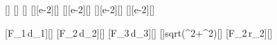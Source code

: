 [\newton]
[\newton]
[\newton]
[\cm][e-2][\meter]
[\cm][e-2][\meter]
[\cm][e-2][\meter]
[\cm][e-2][\meter]

[F_1\,d_1]{\FaX*\daX}[\newton\meter]
[F_2\,d_2]{\FbX*\dbX}[\newton\meter]
[F_3\,d_3]{\FcX*\dcX}[\newton\meter]
[]{sqrt(\xbX^2+\dbX^2)}[\meter]
[F_2\,r_2]{\FbX*\rbX}[\newton\meter]
